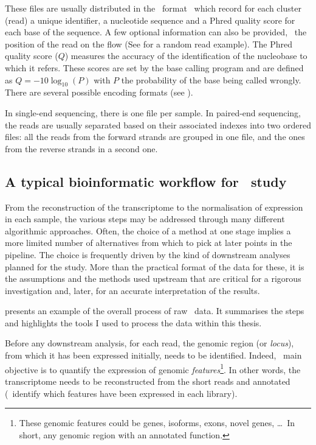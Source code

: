 These files are usually distributed in the \fastq\ format~
which record for each cluster (read) a unique identifier,
a nucleotide sequence and a \gls{Phred} quality score for each base of the
sequence. A few optional information can also be provided, \eg\
the position of the read on the \gls{flow} (See  for
a random read example).
The \gls{Phred} quality score ($Q$) measures the accuracy of the identification
of the nucleobase to which it refers. These scores are set by the base calling
program and are defined as $Q = -10\log_{10}(P)$ with $P$ the probability of
the base being called wrongly. There are several possible encoding formats
(see \Cref{sec:PhredScore}).\mybr\

In single-end sequencing, there is one file per sample.
In paired-end sequencing, the reads are usually separated based on their associated
indexes into two ordered files: all the reads from the forward strands
are grouped in one file, and the ones from the reverse strands
in a second one.\mybr\


\subsection{A typical bioinformatic workflow for \Rnaseq\ study\quad}\label{sub:RNAseqworflow}

From the reconstruction of the
transcriptome to the normalisation of expression in each sample, the various
steps may be addressed through many different algorithmic approaches.
Often, the choice of a method at one stage implies a more limited number of
alternatives from which to pick at later points in the pipeline.
The choice is frequently driven by the kind of downstream analyses planned for
the study. More than the practical format of the data for these, it is the
assumptions and the methods used upstream that are critical for a
rigorous investigation and, later, for an accurate interpretation of the results.\mybr\

 presents an example of the overall 
process of raw \Rnaseq\ data. It summarises the steps and highlights the tools
I used to process the data within this thesis.\mybr\

Before any downstream analysis, for each read, the genomic region (or
\emph{locus}), from which it has been expressed initially, needs to be identified.
Indeed, \Rnaseq\ main objective is to quantify the expression of genomic
\emph{features}\footnote{These genomic features could be genes, isoforms,
exons, novel genes, \dots\
In short, any genomic region with an annotated function.}. In other words,
the transcriptome needs to be reconstructed from the short reads and annotated
(\ie\ identify which features have been expressed in each library).\mybr\

